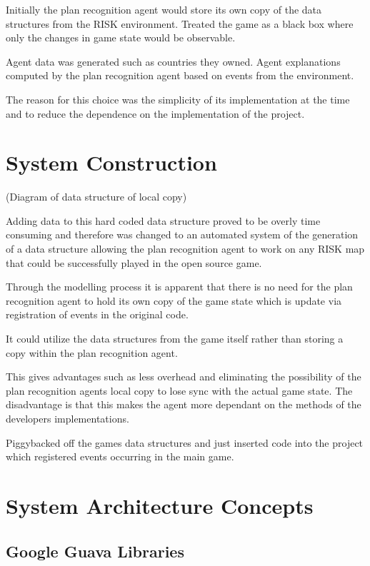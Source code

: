 \documentclass[parskip]{cs4rep}
\begin{document}
Initially the plan recognition agent would store its own copy of the data structures from the RISK environment. Treated the game as a black box where only the changes in game state would be observable.

Agent data was generated such as countries they owned.
Agent explanations computed by the plan recognition agent based on events from the environment.

The reason for this choice was the simplicity of its implementation at the time and to reduce the dependence on the implementation of the project.

\section{System Construction}

(Diagram of data structure of local copy)

Adding data to this hard coded data structure proved to be overly time consuming and therefore was changed to an automated system of the generation of a data structure allowing the plan recognition agent to work on any RISK map that could be successfully played in the open source game.

Through the modelling process it is apparent that there is no need for the plan recognition agent to hold its own copy of the game state which is update via registration of events in the original code.

It could utilize the data structures from the game itself rather than storing a copy within the plan recognition agent.

This gives advantages such as less overhead and eliminating the possibility of the plan recognition agents local copy to lose sync with the actual game state. The disadvantage is that this makes the agent more dependant on the methods of the developers implementations.

Piggybacked off the games data structures and just inserted code into the project which registered events occurring in the main game.

\section{System Architecture Concepts}

\subsection{Google Guava Libraries}
\end{document}
